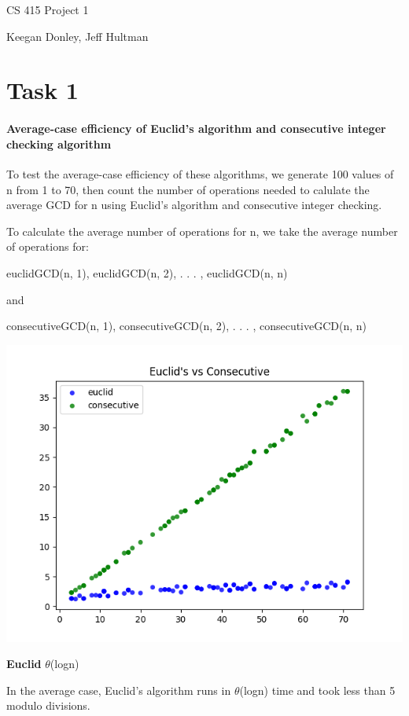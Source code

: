 \documentclass{report}
\begin{document}
	\begin{flushleft}
		\huge CS 415 Project 1
		
		\normalsize Keegan Donley, Jeff Hultman

		\section{Task 1}

		\paragraph{Average-case efficiency of Euclid's algorithm and consecutive integer checking algorithm}
		To test the average-case efficiency of these algorithms, we generate
		100 values of n from 1 to 70, then count the number of
		operations needed to calulate the average GCD for n using
		Euclid's algorithm and consecutive integer checking.

		To calculate the average number of operations for n, we take the average
		number of operations for:
		
		euclidGCD(n, 1), euclidGCD(n, 2), . . . , euclidGCD(n, n)

		and

		consecutiveGCD(n, 1), consecutiveGCD(n, 2), . . . , consecutiveGCD(n, n)

		\includegraphics{task1}

		\textbf{Euclid} $\theta$(logn)

		In the average case, Euclid's algorithm runs in $\theta$(logn) time and took less than 
		5 modulo divisions.
		

\end{flushleft}
\end{document}
